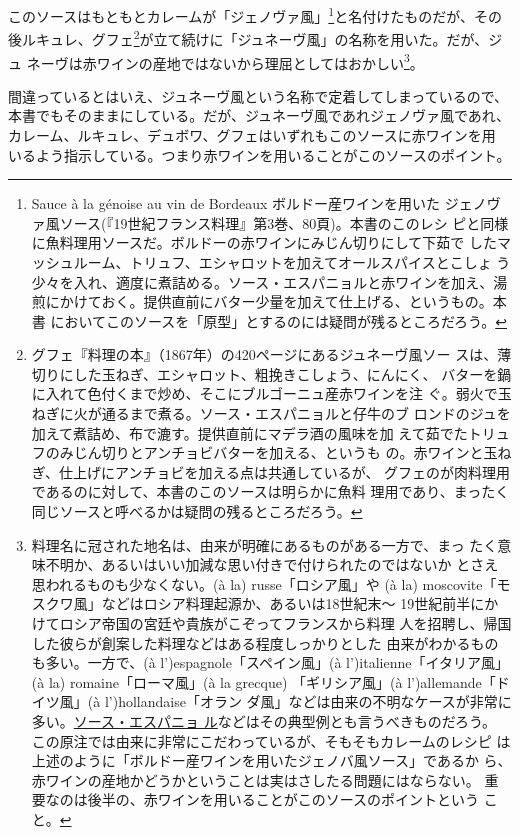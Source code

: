 \begin{recette}
このソースはもともとカレームが「ジェノヴァ風」\footnote{Sauce à la
  génoise au vin de Bordeaux ボルドー産ワインを用いた
  ジェノヴァ風ソース(『19世紀フランス料理』第3巻、80頁)。本書のこのレシ
  ピと同様に魚料理用ソースだ。ボルドーの赤ワインにみじん切りにして下茹で
  したマッシュルーム、トリュフ、エシャロットを加えてオールスパイスとこしょ
  う少々を入れ、適度に煮詰める。ソース・エスパニョルと赤ワインを加え、湯
  煎にかけておく。提供直前にバター少量を加えて仕上げる、というもの。本書
  においてこのソースを「原型」とするのには疑問が残るところだろう。}と名付けたものだが、その
後ルキュレ、グフェ\footnote{グフェ『料理の本』（1867年）の420ページにあるジュネーヴ風ソー
  スは、薄切りにした玉ねぎ、エシャロット、粗挽きこしょう、にんにく、
  バターを鍋に入れて色付くまで炒め、そこにブルゴーニュ産赤ワインを注
  ぐ。弱火で玉ねぎに火が通るまで煮る。ソース・エスパニョルと仔牛のブ
  ロンドのジュを加えて煮詰め、布で漉す。提供直前にマデラ酒の風味を加
  えて茹でたトリュフのみじん切りとアンチョビバターを加える、というも
  の。赤ワインと玉ねぎ、仕上げにアンチョビを加える点は共通しているが、
  グフェのが肉料理用であるのに対して、本書のこのソースは明らかに魚料
  理用であり、まったく同じソースと呼べるかは疑問の残るところだろう。}が立て続けに「ジュネーヴ風」の名称を用いた。だが、ジュ
ネーヴは赤ワインの産地ではないから理屈としてはおかしい\footnote{料理名に冠された地名は、由来が明確にあるものがある一方で、まっ
  たく意味不明か、あるいはいい加減な思い付きで付けられたのではないか
  とさえ思われるものも少なくない。(à la) russe「ロシア風」や (à la)
  moscovite「モスクワ風」などはロシア料理起源か、あるいは18世紀末〜
  19世紀前半にかけてロシア帝国の宮廷や貴族がこぞってフランスから料理
  人を招聘し、帰国した彼らが創案した料理などはある程度しっかりとした
  由来がわかるものも多い。一方で、(à l')espagnole「スペイン風」(à
  l')italienne「イタリア風」(à la) romaine「ローマ風」(à la grecque)
  「ギリシア風」(à l')allemande「ドイツ風」(à l')hollandaise「オラン
  ダ風」などは由来の不明なケースが非常に多い。\protect\hyperlink{sauce-espagnole}{ソース・エスパニョ
  ル}などはその典型例とも言うべきものだろう。\\
  この原注では由来に非常にこだわっているが、そもそもカレームのレシピ
  は上述のように「ボルドー産ワインを用いたジェノバ風ソース」であるか
  ら、赤ワインの産地かどうかということは実はさしたる問題にはならない。
  重要なのは後半の、赤ワインを用いることがこのソースのポイントという
  こと。}。

間違っているとはいえ、ジュネーヴ風という名称で定着してしまっているので、
本書でもそのままにしている。だが、ジュネーヴ風であれジェノヴァ風であれ、
カレーム、ルキュレ、デュボワ、グフェはいずれもこのソースに赤ワインを用
いるよう指示している。つまり赤ワインを用いることがこのソースのポイント。


\end{recette}
